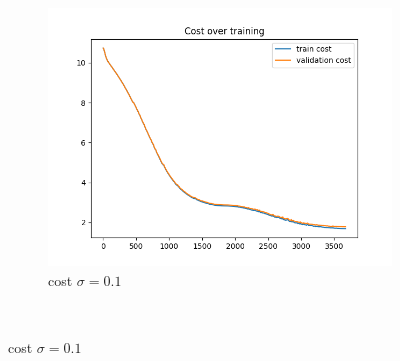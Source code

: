 \documentclass[a4paper]{article}
\begin{document}
\begin{figure}[h]
\begin{subfigure}{0.3\textwidth}
		\includegraphics[width=\linewidth]{images/sens_sigma_0.1_use_bn_False_cost.png}
		\caption{cost $\sigma=0.1$}
	\end{subfigure} \\
	

\end{figure}
\end{document}
